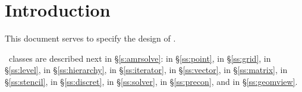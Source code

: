 \documentclass[11pt]{article}
\begin{document}





\section{Introduction}

This document serves to specify the design of \amrSolve. 


\amrSolve\ classes are described next in \S\ref{s:amrsolve}: 
 in \S\ref{ss:point}, 
 in \S\ref{ss:grid}, 
 in \S\ref{ss:level}, 
 in \S\ref{ss:hierarchy}, 
 in \S\ref{ss:iterator}, 
 in \S\ref{ss:vector}, 
 in \S\ref{ss:matrix}, 
 in \S\ref{ss:stencil}, 
 in \S\ref{ss:discret},
 in \S\ref{ss:solver},
 in \S\ref{ss:precon}, and
 in \S\ref{ss:geomview}.
\end{document}
